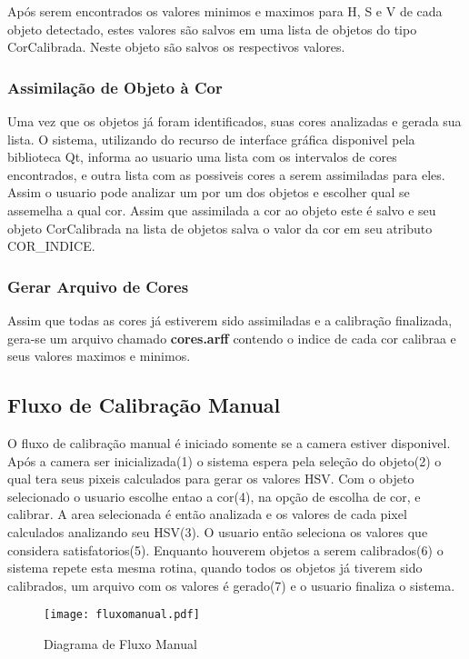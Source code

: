 Após serem encontrados os valores minimos e maximos para H, S e V de cada objeto detectado, estes valores são salvos em uma lista de objetos do tipo CorCalibrada. Neste objeto são salvos os respectivos valores.

 \subsubsection{Assimilação de Objeto à Cor}
 Uma vez que os objetos já foram identificados, suas cores analizadas e gerada sua lista. O sistema, utilizando do recurso de interface gráfica disponivel pela biblioteca Qt, informa ao usuario uma lista com os intervalos de cores encontrados, e outra lista com as possiveis cores a serem assimiladas para eles. Assim o usuario pode analizar um por um dos objetos e escolher qual se assemelha a qual cor. Assim que assimilada a cor ao objeto este é salvo e seu objeto CorCalibrada na lista de objetos salva o valor da cor em seu atributo COR\_INDICE.
 
  \subsubsection{Gerar Arquivo de Cores}
  Assim que todas as cores já estiverem sido assimiladas e a calibração finalizada, gera-se um arquivo chamado \textbf{cores.arff} contendo o indice de cada cor calibraa e seus valores maximos e minimos.
  
  		
  	\subsection{Fluxo de Calibração Manual}	
   	O fluxo de calibração manual é iniciado somente se a camera estiver disponivel. Após a camera ser inicializada(1) o sistema espera pela seleção do objeto(2) o qual tera seus pixeis calculados para gerar os valores HSV. Com o objeto selecionado o usuario escolhe entao a cor(4), na opção de escolha de cor, e calibrar. A area selecionada é então analizada e os valores de cada pixel calculados analizando seu HSV(3).
   	O usuario então seleciona os valores que considera satisfatorios(5). Enquanto houverem objetos a serem calibrados(6) o sistema repete esta mesma rotina, quando todos os objetos já tiverem sido calibrados, um arquivo com os valores é gerado(7) e o usuario finaliza o sistema.
  		\begin{figure}[!h]
  				\centering
  				\texttt{[image: fluxomanual.pdf]}
  				\caption{Diagrama de Fluxo Manual}
  				\label{DiagramaDeFluxoManual}
  			\end{figure}
  			
